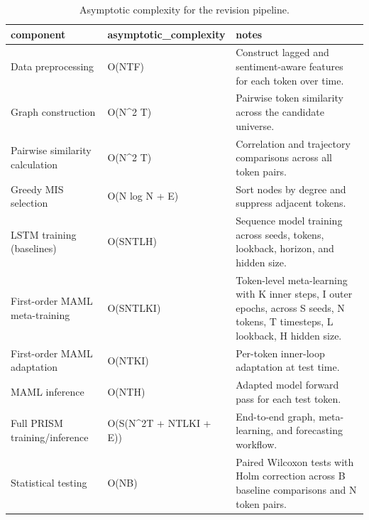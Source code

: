 \begin{table}[htbp]
\centering
\begin{tabular}{lll}
\hline
component & asymptotic_complexity & notes \\
\hline
Data preprocessing & O(NTF) & Construct lagged and sentiment-aware features for each token over time. \\
Graph construction & O(N^2 T) & Pairwise token similarity across the candidate universe. \\
Pairwise similarity calculation & O(N^2 T) & Correlation and trajectory comparisons across all token pairs. \\
Greedy MIS selection & O(N log N + E) & Sort nodes by degree and suppress adjacent tokens. \\
LSTM training (baselines) & O(SNTLH) & Sequence model training across seeds, tokens, lookback, horizon, and hidden size. \\
First-order MAML meta-training & O(SNTLKI) & Token-level meta-learning with K inner steps, I outer epochs, across S seeds, N tokens, T timesteps, L lookback, H hidden size. \\
First-order MAML adaptation & O(NTKI) & Per-token inner-loop adaptation at test time. \\
MAML inference & O(NTH) & Adapted model forward pass for each test token. \\
Full PRISM training/inference & O(S(N^2T + NTLKI + E)) & End-to-end graph, meta-learning, and forecasting workflow. \\
Statistical testing & O(NB) & Paired Wilcoxon tests with Holm correction across B baseline comparisons and N token pairs. \\
\hline
\end{tabular}
\caption{Asymptotic complexity for the revision pipeline.}
\label{table_complexity_analysis}
\end{table}